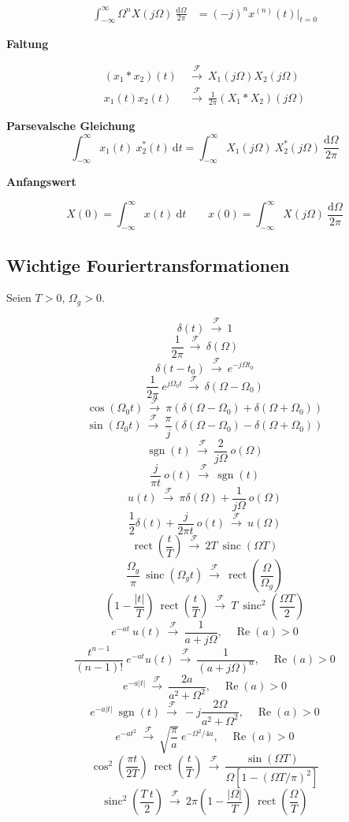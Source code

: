 \documentclass[10pt,a4paper]{article}
\newcommand{\fancyformula}[2]{
	\small
	\raggedright\sffamily\textbf{#1}
	#2
}
\newcommand{\ftransform}{
	~\xrightarrow{~\mathcal{F}~}~
}
\DeclareMathOperator{\sinc}{sinc}
\DeclareMathOperator{\sgn}{sgn}
\DeclareMathOperator{\rect}{rect}
\renewcommand{\Re}{\operatorname{Re}}
\begin{document}
\begin{multicols}{2}
{\begin{align*}
	\int_{-\infty}^{\infty}\Omega^n X(j\Omega) ~ \frac{\mathrm d\Omega}{2\pi}&=(-j)^n x^{(n)}(t) \bigg|_{t=0}
\end{align*}	
}
\fancyformula{Faltung}{
\begin{align*}
	(x_1 \ast x_2)(t) &\ftransform X_1(j\Omega)X_2(j\Omega)\\
	x_1(t)x_2(t) &\ftransform \frac{1}{2\pi} (X_1 \ast X_2)(j\Omega)
\end{align*}
}
\fancyformula{Parsevalsche Gleichung}{\[ \int_{-\infty}^{\infty} x_1(t) ~ x_2^*(t) ~ \mathrm dt = \int_{-\infty}^{\infty}X_1(j\Omega) ~ X_2^*(j\Omega) ~ \frac{\mathrm d\Omega}{2\pi} \]}

\fancyformula{Anfangswert}{
	\[ X(0) = \int_{-\infty}^{\infty} x(t) ~ \mathrm dt \qquad x(0)=\int_{-\infty}^{\infty} X(j\Omega) ~ \frac{\mathrm d\Omega}{2\pi} \]	
}
\end{multicols}
\newpage

\subsection*{Wichtige Fouriertransformationen}
Seien $T>0$, $\Omega_g>0$.
\begin{multicols}{2}
	\small
	\[ \delta(t) \ftransform 1 \]
	\[ \frac{1}{2 \pi} \ftransform \delta(\Omega) \]
	\[ \delta(t - t_0) \ftransform e^{-j\Omega t_0} \]
	\[ \frac{1}{2 \pi} ~ e^{j \Omega_0 t} \ftransform \delta(\Omega - \Omega_0) \]
	\[ \cos(\Omega_0 t) \ftransform \pi \left( \delta(\Omega - \Omega_0) + \delta(\Omega + \Omega_0) \right) \]
	\[ \sin(\Omega_0 t) \ftransform \frac{\pi}{j} \left( \delta(\Omega - \Omega_0) - \delta(\Omega + \Omega_0) \right) \]
	\[ \sgn(t) \ftransform \frac{2}{j \Omega} ~ o(\Omega) \]
	\[ \frac{j}{\pi t} ~ o(t) \ftransform \sgn(t) \]
	\[ u(t) \ftransform \pi \delta(\Omega) + \frac{1}{j \Omega} ~ o(\Omega) \]
	\[ \frac{1}{2} \delta(t) + \frac{j}{2 \pi t} ~ o(t) \ftransform u(\Omega) \]
	\[ \rect \left(\frac{t}{T} \right) \ftransform 2 T ~ \sinc(\Omega T) \]
	\[ \frac{\Omega_g}{\pi} ~ \sinc(\Omega_g t) \ftransform \rect \left( \frac{\Omega}{\Omega_g} \right) \]
	\[ \left(1 - \frac{|t|}{T} \right) ~ \rect \left(\frac{t}{T} \right) \ftransform T ~ \sinc^2 \left( \frac{\Omega T}{2} \right) \]
	\[ e^{-at} ~ u(t) \ftransform \frac{1}{a+j\Omega},\quad \Re(a)>0 \]
	\[ \frac{t^{n-1}}{(n-1)!} ~ e^{-at}u(t) \ftransform \frac{1}{(a+j\Omega)^n},\quad \Re(a)>0 \]
	\[ e^{-a\lvert t \rvert} \ftransform \frac{2a}{a^2+\Omega^2},\quad \Re(a)>0\]
	\[ e^{-a\lvert t \rvert} ~ \sgn(t) \ftransform -j\frac{2\Omega}{a^2+\Omega^2},\quad \Re(a)>0 \]
	\[ e^{-at^2} \ftransform \sqrt{\frac{\pi}{a}}~e^{-\Omega^2/4a},\quad \Re(a)>0 \]
	\[ \cos^2\left(\frac{\pi t}{2T}\right)~\rect\left(\frac{t}{T}\right) \ftransform \frac{\sin(\Omega T)}{\Omega[1-(\Omega T/\pi)^2]} \]
	\[ \sinc^2\left(\frac{T~t}{2}\right) \ftransform 2\pi\left(1-\frac{|\Omega|}{T}\right)~\rect\left(\frac{\Omega}{T}\right) \]
\end{multicols}
\end{document}
